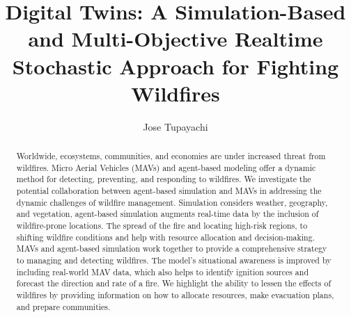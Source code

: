 \documentclass[preprint,review, 11pt,3p,authoryear]{elsarticle}
\begin{document}
\begin{frontmatter}
\title{Digital Twins: A Simulation-Based and Multi-Objective Realtime Stochastic Approach for Fighting Wildfires}







\author[mymainaddress]{Jose Tupayachi}


\address[mymainaddress]{Department of Industrial and Systems Engineering, The University of Tennessee at Knoxville, Knoxville, TN 37996, US}


\doublespacing

\begin{abstract}
Worldwide, ecosystems, communities, and economies are under increased threat from wildfires. Micro Aerial Vehicles (MAVs) and agent-based modeling offer a dynamic method for detecting, preventing, and responding to wildfires. We investigate the potential collaboration between agent-based simulation and MAVs in addressing the dynamic challenges of wildfire management.
Simulation considers weather, geography, and vegetation, agent-based simulation augments real-time data by the inclusion of wildfire-prone locations. The spread of the fire and locating high-risk regions, to shifting wildfire conditions and help with resource allocation and decision-making. MAVs and agent-based simulation work together to provide a comprehensive strategy to managing and detecting wildfires. The model's situational awareness is improved by including real-world MAV data, which also helps to identify ignition sources and forecast the direction and rate of a fire. We highlight the ability to lessen the effects of wildfires by providing information on how to allocate resources, make evacuation plans, and prepare communities.


\end{abstract}
\end{frontmatter}
\end{document}
